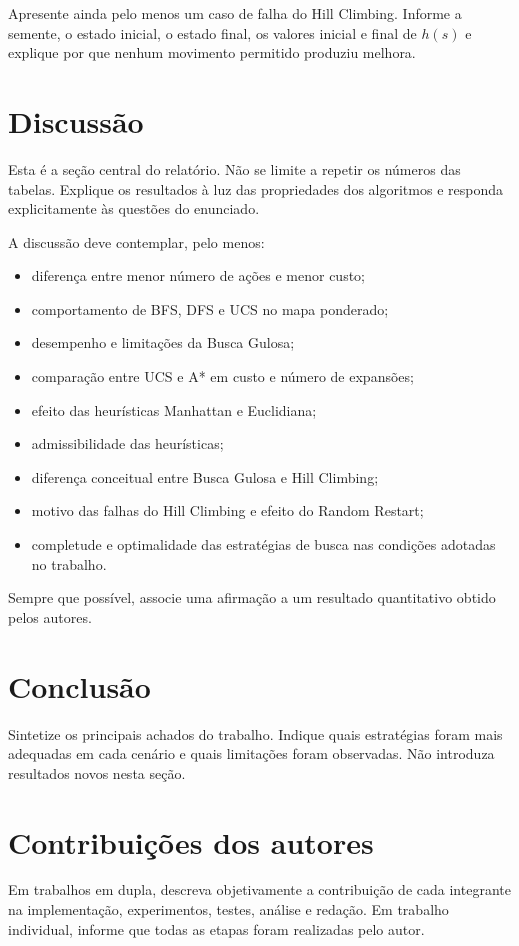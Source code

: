 \documentclass[12pt]{article}
\begin{document}
Apresente ainda pelo menos um caso de falha do Hill Climbing. Informe a semente, o estado inicial, o estado final, os valores inicial e final de $h(s)$ e explique por que nenhum movimento permitido produziu melhora.

\section{Discussão}
Esta é a seção central do relatório. Não se limite a repetir os números das tabelas. Explique os resultados à luz das propriedades dos algoritmos e responda explicitamente às questões do enunciado.

A discussão deve contemplar, pelo menos:
\begin{itemize}
    \item diferença entre menor número de ações e menor custo;
    \item comportamento de BFS, DFS e UCS no mapa ponderado;
    \item desempenho e limitações da Busca Gulosa;
    \item comparação entre UCS e A* em custo e número de expansões;
    \item efeito das heurísticas Manhattan e Euclidiana;
    \item admissibilidade das heurísticas;
    \item diferença conceitual entre Busca Gulosa e Hill Climbing;
    \item motivo das falhas do Hill Climbing e efeito do Random Restart;
    \item completude e optimalidade das estratégias de busca nas condições adotadas no trabalho.
\end{itemize}

Sempre que possível, associe uma afirmação a um resultado quantitativo obtido pelos autores.

\section{Conclusão}
Sintetize os principais achados do trabalho. Indique quais estratégias foram mais adequadas em cada cenário e quais limitações foram observadas. Não introduza resultados novos nesta seção.

\section*{Contribuições dos autores}
Em trabalhos em dupla, descreva objetivamente a contribuição de cada integrante na implementação, experimentos, testes, análise e redação. Em trabalho individual, informe que todas as etapas foram realizadas pelo autor.
\end{document}
